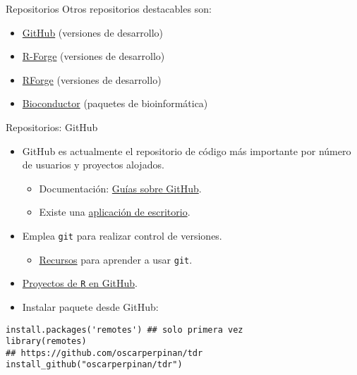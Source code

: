 \documentclass[xcolor={usenames,svgnames,dvipsnames}]{beamer}
\begin{document}
\begin{frame}[label={sec:org9c9df27}]{Repositorios}
Otros repositorios destacables son:

\begin{itemize}
\item \href{https://github.com/}{GitHub} (versiones de desarrollo)

\item \href{http://r-forge.r-project.org/}{R-Forge} (versiones de desarrollo)

\item \href{http://rforge.net/}{RForge} (versiones de desarrollo)

\item \href{http://www.bioconductor.org/}{Bioconductor} (paquetes de bioinformática)
\end{itemize}
\end{frame}

\begin{frame}[label={sec:orgc5162c8},fragile]{Repositorios: GitHub}
 \begin{itemize}
\item GitHub es actualmente el repositorio de código más importante por número de usuarios y proyectos alojados.
\begin{itemize}
\item Documentación: \href{https://guides.github.com/}{Guías sobre GitHub}.
\item Existe una \href{https://desktop.github.com/}{aplicación de escritorio}.
\end{itemize}
\item Emplea \texttt{git} para realizar control de versiones.
\begin{itemize}
\item \href{https://help.github.com/articles/good-resources-for-learning-git-and-github/}{Recursos} para aprender a usar \texttt{git}.
\end{itemize}
\item \href{https://github.com/search?o=desc\&q=language:R\&ref=searchresults\&s=stars\&type=Repositories}{Proyectos de \texttt{R} en GitHub}.
\item Instalar paquete desde GitHub:
\end{itemize}
\lstset{language=r,label= ,caption= ,captionpos=b,numbers=none}
\begin{lstlisting}
install.packages('remotes') ## solo primera vez
library(remotes)
## https://github.com/oscarperpinan/tdr
install_github("oscarperpinan/tdr") 
\end{lstlisting}
\end{frame}
\end{document}
